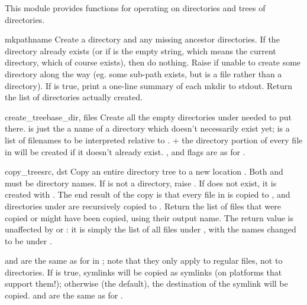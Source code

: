 \documentclass{manual}
\begin{document}
This module provides functions for operating on directories and trees
of directories.

\begin{funcdesc}{mkpath}{name}
Create a directory and any missing ancestor directories.  If the
directory already exists (or if  is the empty string, which
means the current directory, which of course exists), then do
nothing.  Raise  if unable to create some
directory along the way (eg. some sub-path exists, but is a file
rather than a directory).  If  is true, print a one-line
summary of each mkdir to stdout.  Return the list of directories
actually created.
\end{funcdesc}

\begin{funcdesc}{create_tree}{base_dir, files}
Create all the empty directories under  needed to
put  there.   is just the a name of a directory
which doesn't necessarily exist yet;  is a list of filenames
to be interpreted relative to .   + the
directory portion of every file in  will be created if it
doesn't already exist.  ,  and  flags 
are as for .
\end{funcdesc}

\begin{funcdesc}{copy_tree}{src, dst}
Copy an entire directory tree  to a new location .  Both
 and  must be directory names.  If  is not a
directory, raise .  If  does 
not exist, it is created with .  The end result of the 
copy is that every file in  is copied to , and 
directories under  are recursively copied to .  
Return the list of files that were copied or might have been copied,
using their output name. The return value is unaffected by 
or : it is simply the list of all files under ,
with the names changed to be under .

 and  are the same as for
 in ;
note that they only apply to regular files, not to directories.  If
 is true, symlinks will be copied as symlinks
(on platforms that support them!); otherwise (the default), the
destination of the symlink will be copied.   and
 are the same as for
.
\end{funcdesc}
\end{document}
